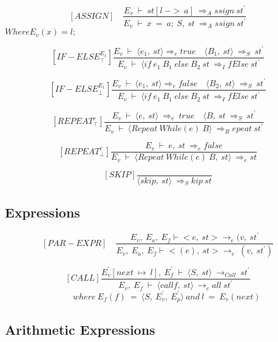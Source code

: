    	\[
   	[ASSIGN] \quad
   	\dfrac{E_v \ \vdash \ st[l \ -> \ a] \ \Rightarrow_Assign \ st^{'}}{E_v \ \vdash \ x \ = \ a; \ S, \ st \ \Rightarrow_Assign \ st^{'}}
   	\]
   	\begin{math}
   		Where E_v(x) = l;
   	\end{math}
   	
   	\[
   	[IF-ELSE^{E_1}_\top]
   	\dfrac{E_v \ \vdash \ \langle e_1, \ st \rangle \Rightarrow_e true \quad \langle B_1, \ st \rangle \ \Rightarrow_S \ st^{'}}{E_v \ \vdash \ \langle if \ e_1 \ B_1 \ else \ B_2 \ st \ \Rightarrow_IfElse \ st^{'}}
   	\]
   	
   	\[
   	[IF-ELSE^{E_1}_\bot]
   	\dfrac{E_v \ \vdash \ \langle e_1, \ st \rangle \Rightarrow_e false \quad \langle B_2, \ st \rangle \ \Rightarrow_S \ st^{'}}{E_v \ \vdash \ \langle if \ e_1 \ B_1 \ else \ B_2 \ st \ \Rightarrow_IfElse \ st^{'}}
   	\]
   	
   	\[
   	[REPEAT^e_\top]
   	\dfrac{E_v \ \vdash \ \langle e, \ st \rangle \ \Rightarrow_e \ true \quad \langle B, \ st \ \Rightarrow_S \ st^{'}}{E_v \ \vdash \ \langle Repeat \ While(e) \ B \rangle \ \Rightarrow_Repeat \ st^{'}}
   	\]
   	
   	\[
   	[REPEAT^e_\bot]
   	\dfrac{E_v \ \vdash \ e, \ st \ \Rightarrow_e false}{E_v \ \vdash \ \langle Repeat \ While(e) \ B, \ st\rangle \ \Rightarrow_e st}
   	\]
   	
   	\[
   	[SKIP]
   	\dfrac{}{\langle skip, \ st \rangle \ \Rightarrow_Skip \ st}
   	\]
   	
   	\subsection{Expressions}
   	
   	\[
   	[PAR-EXPR] \quad
   	\dfrac{E_v, \ E_a, \ E_f \vdash <e, \ st> \rightarrow_e (v, \ st^{'}}{E_v, \ E_a, \ E_f \vdash <(e), \ st> \rightarrow_e \ (v, \ st^{'})}
   	\]
   	
	\[
	[CALL]
	\dfrac{E_v^{'}[next \ \mapsto \ l], \ E_f^{'} \ \vdash \ \langle S, \ st \rangle \ \rightarrow_{Call} \ st^{'}}{E_v, \ E_f \ \vdash \ \langle call f, \ st \rangle \ \rightarrow_call \ st^{'}}
	\]
	\begin{math}		
		\qquad \qquad \qquad \qquad where \ E_f(f) \ = \ \langle S, \ E_v^{'}, \ E_p^{'} \rangle \
		and \ l \ = \ E_v(next)
	\end{math}
   	
   	\subsection{Arithmetic Expressions}
   	
